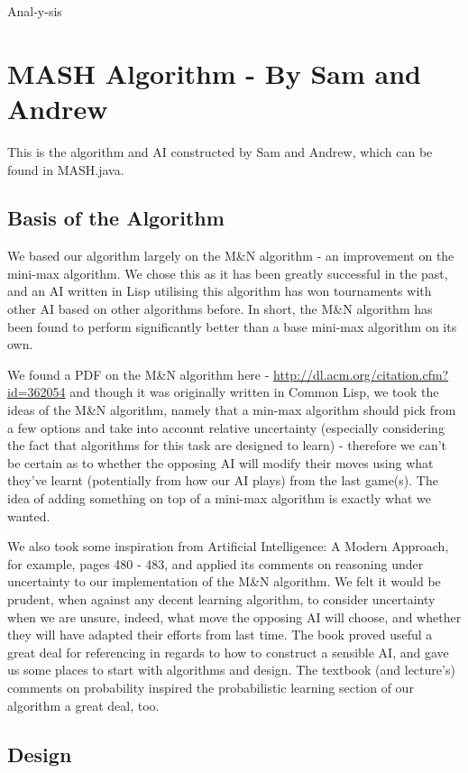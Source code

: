 \documentclass[11pt]{article}
\begin{document}
Anal-y-sis
\section{MASH Algorithm - By Sam and Andrew}
\label{sec-3}

This is the algorithm and AI constructed by Sam and Andrew, which can be found in MASH.java.

\subsection{Basis of the Algorithm}
\label{sec-3-1}

We based our algorithm largely on the M\&N algorithm - an improvement on the mini-max algorithm. We chose this as it has been greatly successful in the past, and an AI written in Lisp utilising this algorithm has won tournaments with other AI based on other algorithms before. In short, the M\&N algorithm has been found to perform significantly better than a base mini-max algorithm on its own.

We found a PDF on the M\&N algorithm here - \url{http://dl.acm.org/citation.cfm?id=362054} and though it was originally written in Common Lisp, we took the ideas of the M\&N algorithm, namely that a min-max algorithm should pick from a few options and take into account relative uncertainty (especially considering the fact that algorithms for this task are designed to learn) - therefore we can't be certain as to whether the opposing AI will modify their moves using what they've learnt (potentially from how our AI plays) from the last game(s). The idea of adding something on top of a mini-max algorithm is exactly what we wanted.

We also took some inspiration from Artificial Intelligence: A Modern Approach, for example, pages 480 - 483, and applied its comments on reasoning under uncertainty to our implementation of the M\&N algorithm. We felt it would be prudent, when against any decent learning algorithm, to consider uncertainty when we are unsure, indeed, what move the opposing AI will choose, and whether they will have adapted their efforts from last time. The book proved useful a great deal for referencing in regards to how to construct a sensible AI, and gave us some places to start with algorithms and design. The textbook (and lecture's) comments on probability inspired the probabilistic learning section of our algorithm a great deal, too.
\subsection{Design}
\label{sec-3-2}
\end{document}
